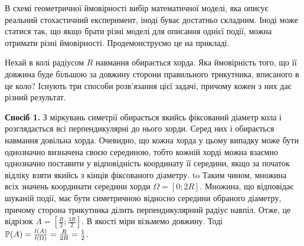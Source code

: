В схемі геометричної ймовірності вибір математичної моделі, яка описує реальний стохастичний експеримент, іноді буває достатньо складним.
Іноді може статися так, що якщо брати різні моделі для описання однієї події, можна отримати різні ймовірності.
Продемонструємо це на прикладі.

\begin{example}
    Нехай в колі радіусом $R$ навмання обирається хорда. Яка ймовірність того, 
    що її довжина буде більшою за довжину сторони правильного трикутника, 
    вписаного в це коло?
    \newline
    Існують три способи розв'язання цієї задачі, причому кожен з них дає різний результат.
    
    \textbf{Спосіб 1.}
    З міркувань симетрії обирається якийсь фіксований діаметр кола і розглядається
    всі перпендикулярні до нього хорди. Серед них і обирається навмання довільна хорда.
    Очевидно, що кожна хорда у цьому випадку може бути однозначно визначена своєю серединою,
    тобто кожній хорді можна взаємно однозначно поставити у відповідність координату її середини,
    якщо за початок відліку взяти якийсь з кінців фіксованого діаметру.
    \newline
    \hbox to 
    Таким чином, множина всіх значень координати середини хорди $\Omega = \left[0; 2R\right]$. 
    Множина, що відповідає шуканій події, має бути симетричною відносно середини обраного діаметру,
    причому сторона трикутника ділить перпендикулярний радіус навпіл. Отже, це відрізок $A = \left[\frac{R}{2}; \frac{3R}{2}\right]$.
    В якості міри візьмемо довжину. Тоді $\P(A) = \frac{l(A)}{l(\Omega)} = \frac{R}{2R}= \frac{1}{2}$.
    

\end{example}

